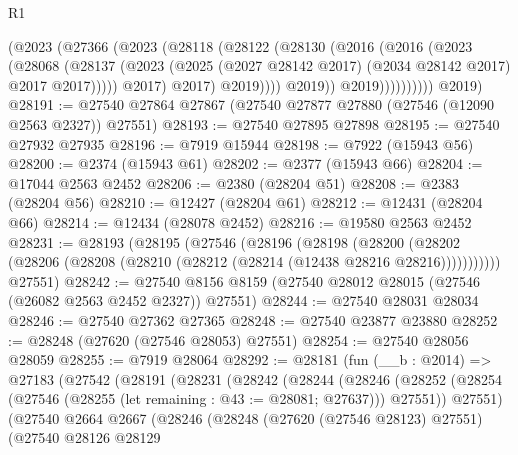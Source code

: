 \begin{lexlean}{R1}
\begin{coremodule}
                          (@2023
                            (@27366
                              (@2023
                                (@28118
                                  (@28122
                                    (@28130
                                      (@2016
                                        (@2016
                                          (@2023
                                            (@28068
                                              (@28137
                                                (@2023
                                                  (@2025
                                                    (@2027 @28142 @2017)
                                                    (@2034 @28142 @2017)
                                                    @2017
                                                    @2017)))))
                                          @2017)
                                        @2017)
                                      @2019))))
                              @2019))
                          @2019))))))))))
      @2019)
@28191 := @27540 @27864 @27867 (@27540 @27877 @27880 (@27546 (@12090 @2563 @2327)) @27551)
@28193 := @27540 @27895 @27898
@28195 := @27540 @27932 @27935
@28196 := @7919 @15944
@28198 := @7922 (@15943 @56)
@28200 := @2374 (@15943 @61)
@28202 := @2377 (@15943 @66)
@28204 := @17044 @2563 @2452
@28206 := @2380 (@28204 @51)
@28208 := @2383 (@28204 @56)
@28210 := @12427 (@28204 @61)
@28212 := @12431 (@28204 @66)
@28214 := @12434 (@28078 @2452)
@28216 := @19580 @2563 @2452
@28231 := @28193
    (@28195
      (@27546
        (@28196
          (@28198
            (@28200 (@28202 (@28206 (@28208 (@28210 (@28212 (@28214 (@12438 @28216 @28216)))))))))))
      @27551)
@28242 := @27540 @8156 @8159 (@27540 @28012 @28015 (@27546 (@26082 @2563 @2452 @2327)) @27551)
@28244 := @27540 @28031 @28034
@28246 := @27540 @27362 @27365
@28248 := @27540 @23877 @23880
@28252 := @28248 (@27620 (@27546 @28053) @27551)
@28254 := @27540 @28056 @28059
@28255 := @7919 @28064
@28292 := @28181
    (fun (__b : @2014) =>
    @27183
      (@27542
        (@28191
          (@28231
            (@28242
              (@28244
                (@28246
                  (@28252 (@28254 (@27546 (@28255 (let remaining : @43 := @28081; @27637))) @27551))
                  @27551)
                (@27540
                  @2664
                  @2667
                  (@28246
                    (@28248
                      (@27620 (@27546 @28123) @27551)
                      (@27540
                        @28126
                        @28129

\end{coremodule}
\end{lexlean}
